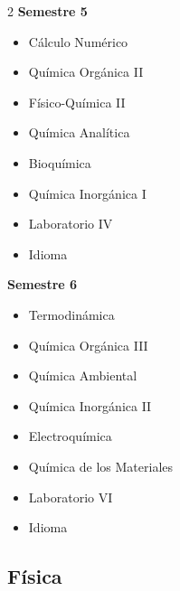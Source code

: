 \documentclass[12pt,a4paper]{article}
\begin{document}
\begin{multicols}{2}
		\textbf{Semestre 5}
		\begin{itemize}
			\item Cálculo Numérico
			\item Química Orgánica II
			\item Físico-Química II
			\item Química Analítica
			\item Bioquímica
			\item Química Inorgánica I
			\item Laboratorio IV
			\item Idioma
		\end{itemize}
		
		\textbf{Semestre 6}
		\begin{itemize}
			\item Termodinámica
			\item Química Orgánica III
			\item Química Ambiental
			\item Química Inorgánica II
			\item Electroquímica
			\item Química de los Materiales
			\item Laboratorio VI
			\item Idioma
		\end{itemize}
	\end{multicols}
	
	\newpage
	
	\subsection{Física}
	
\end{document}
